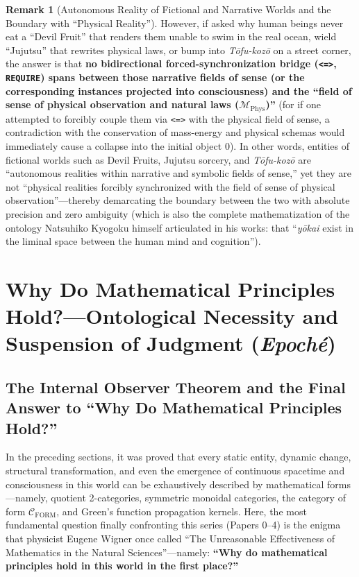 \documentclass[11pt,a4paper]{article}
\theoremstyle{definition}
\newtheorem{remark}{Remark}[section]
\theoremstyle{plain}
\begin{document}
\begin{remark}[Autonomous Reality of Fictional and Narrative Worlds and the Boundary with ``Physical Reality'']
However, if asked why human beings never eat a ``Devil Fruit'' that renders them unable to swim in the real ocean, wield ``Jujutsu'' that rewrites physical laws, or bump into \textit{T\=ofu-koz\=o} on a street corner, the answer is that \textbf{no bidirectional forced-synchronization bridge (\texttt{<=>}, \texttt{REQUIRE}) spans between those narrative fields of sense (or the corresponding instances projected into consciousness) and the ``field of sense of physical observation and natural laws ($\mathcal{M}_{\mathrm{Phys}}$)''} (for if one attempted to forcibly couple them via \texttt{<=>} with the physical field of sense, a contradiction with the conservation of mass-energy and physical schemas would immediately cause a collapse into the initial object $0$). In other words, entities of fictional worlds such as Devil Fruits, Jujutsu sorcery, and \textit{T\=ofu-koz\=o} are ``autonomous realities within narrative and symbolic fields of sense,'' yet they are not ``physical realities forcibly synchronized with the field of sense of physical observation''---thereby demarcating the boundary between the two with absolute precision and zero ambiguity (which is also the complete mathematization of the ontology Natsuhiko Kyogoku himself articulated in his works: that ``\textit{y\=okai} exist in the liminal space between the human mind and cognition'').
\end{remark}

\section{Why Do Mathematical Principles Hold?---Ontological Necessity and Suspension of Judgment (\textit{Epoch\'e})}

\subsection{The Internal Observer Theorem and the Final Answer to ``Why Do Mathematical Principles Hold?''}
In the preceding sections, it was proved that every static entity, dynamic change, structural transformation, and even the emergence of continuous spacetime and consciousness in this world can be exhaustively described by mathematical forms---namely, quotient 2-categories, symmetric monoidal categories, the category of form $\mathcal{C}_{\mathrm{FORM}}$, and Green's function propagation kernels. Here, the most fundamental question finally confronting this series (Papers 0--4) is the enigma that physicist Eugene Wigner once called ``The Unreasonable Effectiveness of Mathematics in the Natural Sciences''---namely: \textbf{``Why do mathematical principles hold in this world in the first place?''}
\end{document}
